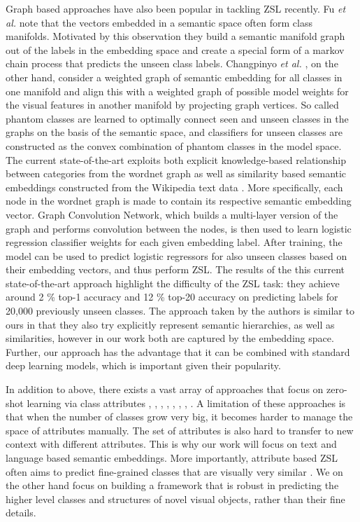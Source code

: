 \documentclass[12pt]{report}
\begin{document}
Graph based approaches have also been popular in tackling ZSL recently. Fu \textit{et al.} \cite{Fu2015a} note that the vectors embedded in a semantic space often form class manifolds. Motivated by this observation they build a semantic manifold graph out of the labels in the embedding space and create a special form of a markov chain process that predicts the unseen class labels. Changpinyo \textit{et al.} \cite{Changpinyo2016}, on the other hand, consider a weighted graph of semantic embedding for all classes in one manifold and align this with a weighted graph of possible model weights for the visual features in another manifold by projecting graph vertices. So called phantom classes are learned to optimally connect seen and unseen classes in the graphs on the basis of the semantic space, and classifiers for unseen classes are constructed as the convex combination of phantom classes in the model space. The current state-of-the-art \cite{Wang2018a} exploits both explicit knowledge-based relationship between categories from the wordnet graph as well as similarity based semantic embeddings constructed from the Wikipedia text data \cite{Pennington2014}. More specifically, each node in the wordnet graph is made to contain its respective semantic embedding vector. Graph Convolution Network, which builds a multi-layer version of the graph and performs convolution between the nodes, is then used to learn logistic regression classifier weights for each given embedding label. After training, the model can be used to predict logistic regressors for also unseen classes based on their embedding vectors, and thus perform ZSL. The results of the this current state-of-the-art approach highlight the difficulty of the ZSL task: they achieve around 2 \% top-1 accuracy and 12 \% top-20 accuracy on predicting labels for 20,000 previously unseen classes. The approach taken by the authors is similar to ours in that they also try explicitly represent semantic hierarchies, as well as similarities, however in our work both are captured by the embedding space. Further, our approach has the advantage that it can be combined with standard deep learning models, which is important given their popularity.

In addition to above, there exists a vast array of approaches that focus on zero-shot learning via class attributes \cite{Farhadi2010}, \cite{Rohrbach2010}, \cite{Rohrbach2011}, \cite{Hwang2014}, \cite{Akata2016}, \cite{Xian2016}, \cite{Romera-Paredes2017}, \cite{Bucher2016}. A limitation of these approaches is that when the number of classes grow very big, it becomes harder to manage the space of attributes manually. The set of attributes is also hard to transfer to new context \cite{Ba2014} with different attributes. This is why our work will focus on text and language based semantic embeddings. More importantly, attribute based ZSL often aims to predict fine-grained classes that are visually very similar \cite{Xian2016} \cite{Reed2016}. We on the other hand focus on building a framework that is robust in predicting the higher level classes and structures of novel visual objects, rather than their fine details.
\end{document}
